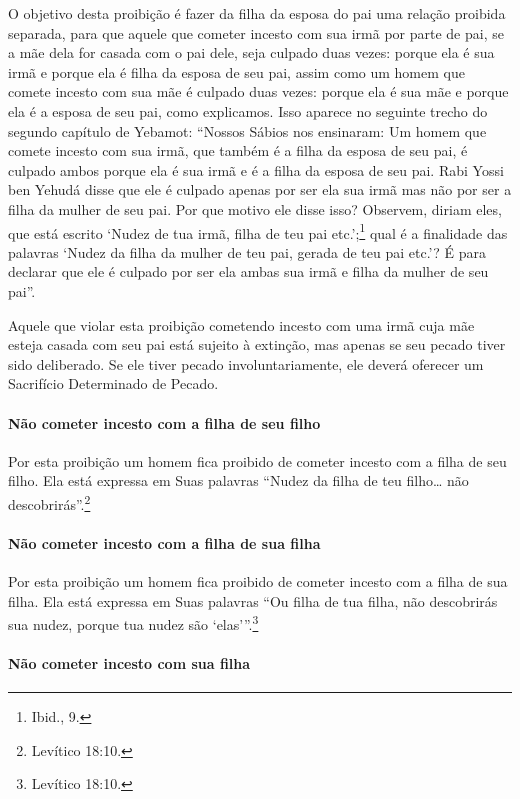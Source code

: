 O objetivo desta proibição é fazer da filha da esposa do pai uma relação
proibida separada, para que aquele que cometer incesto com sua irmã por
parte de pai, se a mãe dela for casada com o pai dele, seja culpado duas
vezes: porque ela é sua irmã e porque ela é filha da esposa de seu pai,
assim como um homem que comete incesto com sua mãe é culpado duas vezes:
porque ela é sua mãe e porque ela é a esposa de seu pai, como
explicamos. Isso aparece no seguinte trecho do segundo capítulo de
Yebamot: ``Nossos Sábios nos ensinaram: Um homem que comete incesto com
sua irmã, que também é a filha da esposa de seu pai, é culpado ambos
porque ela é sua irmã e é a filha da esposa de seu pai. Rabi Yossi ben
Yehudá disse que ele é culpado apenas por ser ela sua irmã mas não por
ser a filha da mulher de seu pai. Por que motivo ele disse isso?
Observem, diriam eles, que está escrito `Nudez de tua irmã, filha de teu
pai etc.';\footnote{Ibid., 9.} qual é a finalidade das palavras `Nudez da filha
da mulher de teu pai, gerada de teu pai etc.'? É para declarar que ele
é culpado por ser ela ambas sua irmã e filha da mulher de seu pai''.

Aquele que violar esta proibição cometendo incesto com uma irmã cuja mãe
esteja casada com seu pai está sujeito à extinção, mas apenas se seu
pecado tiver sido deliberado. Se ele tiver pecado involuntariamente, ele
deverá oferecer um Sacrifício Determinado de Pecado.

\paragraph{Não cometer incesto com a filha de seu filho}

Por esta proibição um homem fica proibido de cometer incesto com a filha
de seu filho. Ela está expressa em Suas palavras ``Nudez da filha de teu
filho\ldots{} não descobrirás''.\footnote{Levítico 18:10.}

\paragraph{Não cometer incesto com a filha de sua filha}

Por esta proibição um homem fica proibido de cometer incesto com a filha
de sua filha. Ela está expressa em Suas palavras ``Ou filha de tua
filha, não descobrirás sua nudez, porque tua nudez são `elas'''.\footnote{Levítico 18:10.}

\paragraph{Não cometer incesto com sua filha}

